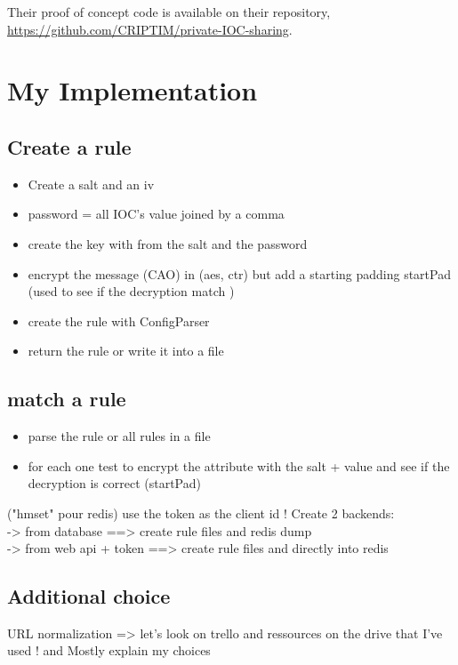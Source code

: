 \documentclass{eplmastersthesis}
\begin{document}
Their proof of concept code is available on their repository, \url{https://github.com/CRIPTIM/private-IOC-sharing}. 


\section{My Implementation}

\subsection{Create a rule}
\begin{itemize}
\item Create a salt and an iv
\item password = all IOC's value joined by a comma
\item create the key with from the salt and the password
\item encrypt the message (CAO) in (aes, ctr) but add a starting padding startPad (used to see if the decryption match )
\item create the rule with ConfigParser 
\item return the rule or write it into a file
\end{itemize}

\subsection{match a rule}
\begin{itemize}
\item parse the rule or all rules in a file
\item for each one test to encrypt the attribute with the salt + value and see if the decryption is correct (startPad)
\end{itemize}

\info("hmset" pour redis)
use the token as the client id !
Create 2 backends:\\
-> from  database ==> create rule files and redis dump \\
-> from web api + token ==> create rule files and directly into redis \\

\subsection{Additional choice}
URL normalization => let's look on trello and ressources on the drive that I've used ! and Mostly explain my choices \\
\end{document}
